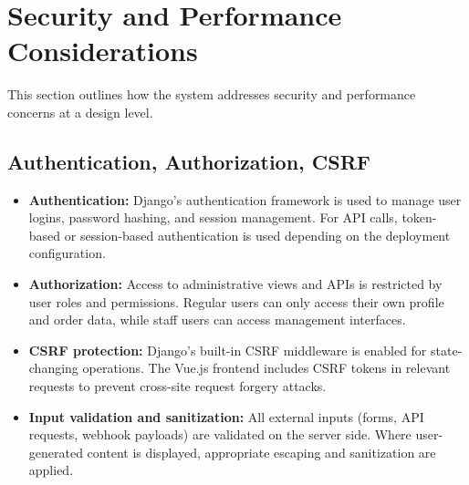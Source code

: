 \section{Security and Performance Considerations}
This section outlines how the system addresses security and performance concerns at a design level.

\subsection{Authentication, Authorization, CSRF}
\begin{itemize}
  \item \textbf{Authentication:} Django’s authentication framework is used to manage user logins, password hashing, and session management. For API calls, token-based or session-based authentication is used depending on the deployment configuration.
  \item \textbf{Authorization:} Access to administrative views and APIs is restricted by user roles and permissions. Regular users can only access their own profile and order data, while staff users can access management interfaces.
  \item \textbf{CSRF protection:} Django’s built-in CSRF middleware is enabled for state-changing operations. The Vue.js frontend includes CSRF tokens in relevant requests to prevent cross-site request forgery attacks.
  \item \textbf{Input validation and sanitization:} All external inputs (forms, API requests, webhook payloads) are validated on the server side. Where user-generated content is displayed, appropriate escaping and sanitization are applied.
\end{itemize}

